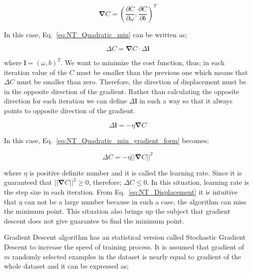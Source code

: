 \documentclass[a4paper,times,hidelinks,12pt]{article}
\begin{document}
\begin{equation}
\label{eq:gradient}
\boldsymbol{\nabla}{C} = \left(\frac{\partial{C}}{\partial{\omega}},\frac{\partial{C}}{\partial{b}} \right)^T
\end{equation}

\noindent In this case, Eq.~\eqref{eq:NT_Quadratic_min} can be written as;

\begin{equation}
\label{eq:NT_Quadratic_min_gradient_form}
\Delta{C} = \boldsymbol{\nabla}{C} \cdot \Delta \boldsymbol{l}
\end{equation}

\noindent where $\boldsymbol{l} = (\omega, b)^T$. We want to minimize the cost function, thus; in each iteration value of the $C$ must be smaller than the previous one which means that $\Delta{C}$ must be smaller than zero. Therefore, the direction of displacement must be in the opposite direction of the gradient. Rather than calculating the opposite direction for each iteration we can define $\Delta{\boldsymbol{l}}$ in such a way so that it always points to opposite direction of the gradient.

\begin{equation}
\label{eq:NT_learning_rate}
\Delta{\boldsymbol{l}} = -\eta\boldsymbol{\nabla}C
\end{equation}

\noindent In this case, Eq.~\eqref{eq:NT_Quadratic_min_gradient_form} becomes;

\begin{equation}
\label{eq:NT_Displacement}
\Delta{C} = -\eta ||\boldsymbol{\nabla}{C}||^2
\end{equation}

\noindent where $\eta$ is positive definite number and it is called the learning rate. Since it is guaranteed that $||\boldsymbol{\nabla}{C}||^2 \geq 0$, therefore; $\Delta{C} \leq 0$. In this situation, learning rate is the step size in each iteration. From Eq.~\eqref{eq:NT_Displacement} it is intuitive that $\eta$ can not be a large number because in such a case, the algorithm can miss the minimum point. This situation also brings up the subject that gradient descent does not give guarantee to find the minimum point.

Gradient Descent algorithm has an statistical version called Stochastic Gradient Descent to increase the speed of training process. It is assumed that gradient of  $m$ randomly selected examples in the dataset is nearly equal to gradient of the whole dataset and it can be expressed as;
\end{document}
